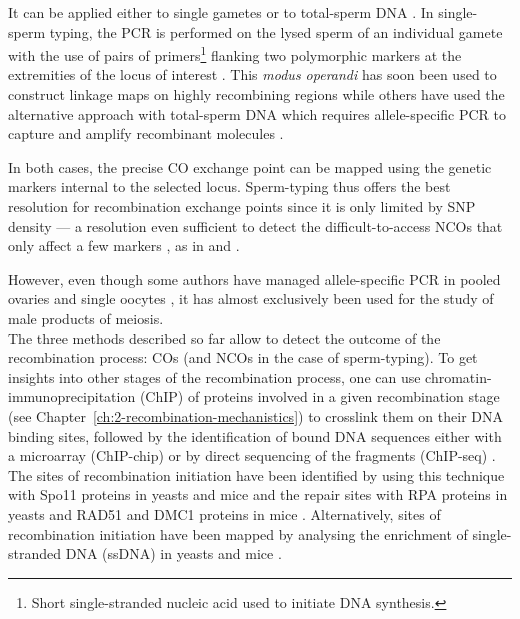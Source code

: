 It can be applied either to single gametes or to total-sperm DNA \citep[reviewed in][]{arnheim2003hot}.
In single-sperm typing, the PCR is performed on the lysed sperm of an individual gamete with the use of pairs of primers\footnote{Short single-stranded nucleic acid used to initiate DNA synthesis.} flanking two polymorphic markers at the extremities of the locus of interest \citep{cui1989singlesperm,lien1993simple}.
This \textit{modus operandi} has soon been used to construct linkage maps on highly recombining regions \citep{schmitt1994multipoint,lien2000evidence,cullen2002highresolution} while others \citep{tusie-luna1995gene, jeffreys1998highresolution, jeffreys2001intensely, guillon2002initiation} have used the alternative approach with total-sperm DNA which requires allele-specific PCR to capture and amplify recombinant molecules \citep{wu1989allelespecific}.

In both cases, the precise CO exchange point can be mapped using the genetic markers internal to the selected locus.
Sperm-typing thus offers the best resolution for recombination exchange points since it is only limited by SNP density — a resolution even sufficient to detect the difficult-to-access NCOs that only affect a few markers \citep{hellenthal2006insights}, as in \citet{tusie-luna1995gene} and \citet{guillon2002initiation}.

However, even though some authors have managed allele-specific PCR in pooled ovaries \citep{guillon2005crossover, baudat2007cis} and single oocytes \citep{cole2014mouse}, it has almost exclusively been used for the study of male products of meiosis.\\

The three methods described so far allow to detect the outcome of the recombination process: COs (and NCOs in the case of sperm-typing).
To get insights into other stages of the recombination process, one can use chromatin-immunoprecipitation (ChIP) of proteins involved in a given recombination stage (see Chapter~\ref{ch:2-recombination-mechanistics}) to crosslink them on their DNA binding sites, followed by the identification of bound DNA sequences either with a microarray (ChIP-chip) or by direct sequencing of the fragments (ChIP-seq) \citep[reviewed in][]{park2009chipseq}. 
The sites of recombination initiation have been identified by using this technique with Spo11 proteins in yeasts \citep{gerton2000global,mieczkowski2007loss,pan2011hierarchical} and mice \citep{lange2016landscape} and the repair sites with RPA proteins in yeasts \citep{borde2009histone} and RAD51 and DMC1 proteins in mice \citep{smagulova2011genomewide,brick2012genetic}.
Alternatively, sites of recombination initiation have been mapped by analysing the enrichment of single-stranded DNA (ssDNA) in yeasts \citep{blitzblau2007mapping,buhler2007mapping} and mice \citep{khil2012sensitive}.

